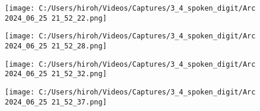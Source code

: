 \documentclass{ltjsarticle}
\begin{document}
\begin{figure}[htbp]
  \centering
  \texttt{[image: C:/Users/hiroh/Videos/Captures/3\_4\_spoken\_digit/Arc 2024\_06\_25 21\_52\_22.png]}
\end{figure}
\begin{figure}[htbp]
  \centering
  \texttt{[image: C:/Users/hiroh/Videos/Captures/3\_4\_spoken\_digit/Arc 2024\_06\_25 21\_52\_28.png]}
\end{figure}
\begin{figure}[htbp]
  \centering
  \texttt{[image: C:/Users/hiroh/Videos/Captures/3\_4\_spoken\_digit/Arc 2024\_06\_25 21\_52\_32.png]}
\end{figure}
\begin{figure}[htbp]
  \centering
  \texttt{[image: C:/Users/hiroh/Videos/Captures/3\_4\_spoken\_digit/Arc 2024\_06\_25 21\_52\_37.png]}
\end{figure}

\clearpage
\end{document}
